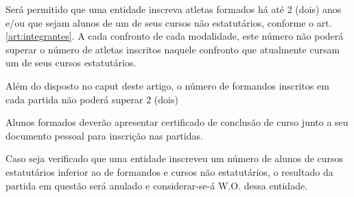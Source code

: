 \begin{article}
	Será permitido que uma entidade inscreva atletas formados há até 2 (dois) anos e/ou que sejam alunos de um de seus cursos não estatutários, conforme o art. \ref{art:integrantes}\ulo. A cada confronto de cada modalidade, este número não poderá superar o número de atletas inscritos naquele confronto que atualmente cursam um de seus cursos estatutários.

	\begin{xparagraph}
		Além do disposto no caput deste artigo, o número de formandos inscritos em cada partida não poderá superar 2 (dois)
	\end{xparagraph}

	\begin{xparagraph}
		Alunos formados deverão apresentar certificado de conclusão de curso junto a seu documento pessoal para inscrição nas partidas.
	\end{xparagraph}

	\begin{xparagraph}
		Caso seja verificado que uma entidade inscreveu um número de alunos de cursos estatutários inferior ao de formandos e cursos não estatutários, o resultado da partida em questão será anulado e considerar-se-á W.O. dessa entidade.
	\end{xparagraph}
\end{article}
